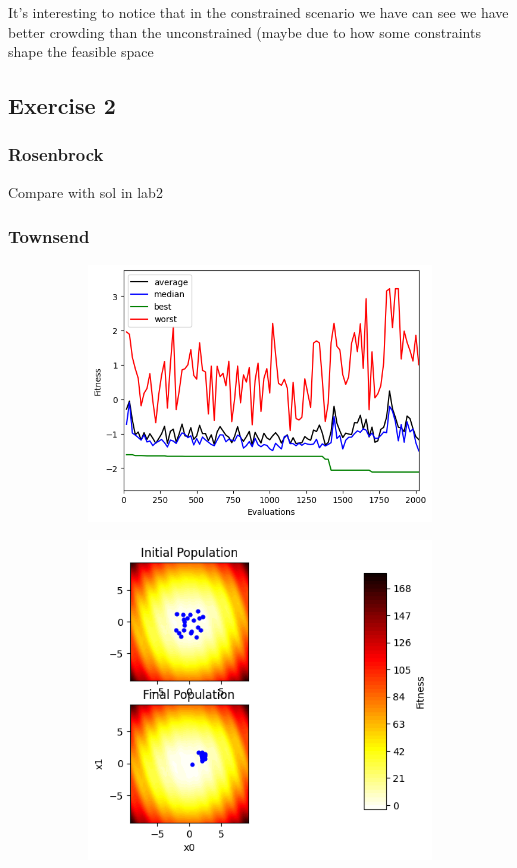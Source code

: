 It's interesting to notice that in the constrained scenario we have can see we have better crowding than the unconstrained (maybe due to how some constraints shape the feasible space 

\subsection{Exercise 2}
\subsubsection{Rosenbrock}
Compare with sol in lab2
\subsubsection{Townsend}
\begin{figure}[H]
    \centering
    \begin{subfigure}[t]{0.5\textwidth}
        \centering
        \includegraphics[width=\linewidth]{images/lab5/townsend_fitness.png}
    \end{subfigure}%
    \begin{subfigure}[t]{0.5\textwidth}
        \centering
        \includegraphics[width=\linewidth]{images/lab5/townsend_population.png}

\end{subfigure}
\end{figure}
